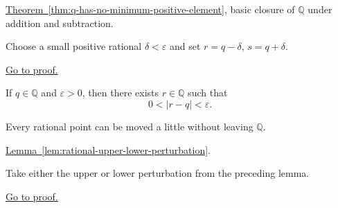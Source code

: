 \begin{remark*}[Dependencies]
\hyperref[thm:q-has-no-minimum-positive-element]{Theorem~\ref*{thm:q-has-no-minimum-positive-element}},
basic closure of $\mathbb{Q}$ under addition and subtraction.
\end{remark*}

\begin{remark*}
Choose a small positive rational $\delta<\varepsilon$ and set
$r=q-\delta$, $s=q+\delta$.
\end{remark*}

\begin{remark*}[Proof]
\hyperref[prf:rational-upper-lower-perturbation]{Go to proof.}
\end{remark*}

\begin{tcolorbox}[colback=thmbox, colframe=thmborder, arc=2pt,
  left=6pt, right=6pt, top=4pt, bottom=4pt,
  title={\small\textbf{Lemma (Rational Perturbation Lemma)}},
  fonttitle=\small\bfseries]
\begin{lemma}
\label{lem:rational-perturbation-lemma}
If $q\in\mathbb{Q}$ and $\varepsilon>0$, then there exists $r\in\mathbb{Q}$
such that
\[
0<|r-q|<\varepsilon.
\]
\end{lemma}
\end{tcolorbox}

\begin{remark*}[Interpretation]
Every rational point can be moved a little without leaving $\mathbb{Q}$.
\end{remark*}

\begin{remark*}[Dependencies]
\hyperref[lem:rational-upper-lower-perturbation]{Lemma~\ref*{lem:rational-upper-lower-perturbation}}.
\end{remark*}

\begin{remark*}
Take either the upper or lower perturbation from the preceding lemma.
\end{remark*}

\begin{remark*}[Proof]
\hyperref[prf:rational-perturbation-lemma]{Go to proof.}
\end{remark*}
